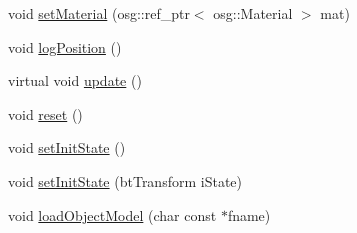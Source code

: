 \begin{DoxyCompactItemize}
void \hyperlink{classbtosgObject_a6ab7b9e0553dab398b980637788b56a8}{set\+Material} (osg\+::ref\+\_\+ptr$<$ osg\+::\+Material $>$ mat)
\item 
void \hyperlink{classbtosgObject_acfd70fa6477c80fd7f29ad7ab9f4f067}{log\+Position} ()
\item 
virtual void \hyperlink{classbtosgObject_a342917817dfde62554f83da8e0d5110b}{update} ()
\item 
void \hyperlink{classbtosgObject_a93983f9180dd0672f8779cf2baa78580}{reset} ()
\item 
void \hyperlink{classbtosgObject_ad1508a0ce28cfac83e5f0ff6245f91b5}{set\+Init\+State} ()
\item 
void \hyperlink{classbtosgObject_a6ceb08e59ee95acaaef389ee198d2b56}{set\+Init\+State} (bt\+Transform i\+State)
\item 
void \hyperlink{classbtosgObject_a91838b8235579da178fcc06e6d3d47f3}{load\+Object\+Model} (char const $\ast$fname)
\end{DoxyCompactItemize}
